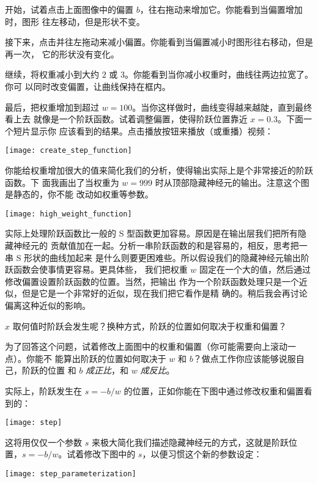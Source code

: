 开始，试着点击上面图像中的偏置 $b$，往右拖动来增加它。你能看到当偏置增加时，图形
往左移动，但是形状不变。

接下来，点击并往左拖动来减小偏置。你能看到当偏置减小时图形往右移动，但是再一次，
它的形状没有变化。

继续，将权重减小到大约 $2$ 或 $3$。你能看到当你减小权重时，曲线往两边拉宽了。你可
以同时改变偏置，让曲线保持在框内。

最后，把权重增加到超过 $w = 100$。当你这样做时，曲线变得越来越陡，直到最终看上去
就像是一个阶跃函数。试着调整偏置，使得阶跃位置靠近 $x = 0.3$。下面一个短片显示你
应该看到的结果。点击播放按钮来播放（或重播）视频：
\begin{center}
  \texttt{[image: create\_step\_function]}
\end{center}


你能给权重增加很大的值来简化我们的分析，使得输出实际上是个非常接近的阶跃函数。下
面我画出了当权重为 $w = 999$ 时从顶部隐藏神经元的输出。注意这个图是静态的，你不能
改动如权重等参数。
\begin{center}
  \texttt{[image: high\_weight\_function]}
\end{center}

实际上处理阶跃函数比一般的 S 型函数更加容易。原因是在输出层我们把所有隐藏神经元的
贡献值加在一起。分析一串阶跃函数的和是容易的，相反，思考把一串 S 形状的曲线加起来
是什么则要更困难些。所以假设我们的隐藏神经元输出阶跃函数会使事情更容易。更具体些，
我们把权重 $w$ 固定在一个大的值，然后通过修改偏置设置阶跃函数的位置。当然，把输出
作为一个阶跃函数处理只是一个近似，但是它是一个非常好的近似，现在我们把它看作是精
确的。稍后我会再讨论偏离这种近似的影响。

$x$ 取何值时阶跃会发生呢？换种方式，阶跃的位置如何取决于权重和偏置？

为了回答这个问题，试着修改上面图中的权重和偏置（你可能需要向上滚动一点）。你能不
能算出阶跃的位置如何取决于 $w$ 和 $b$？做点工作你应该能够说服自己，阶跃的位置
和 $b$ \emph{成正比}，和 $w$ \emph{成反比}。

实际上，阶跃发生在 $s = -b/w$ 的位置，正如你能在下图中通过修改权重和偏置看到的：
\begin{center}
  \texttt{[image: step]}
\end{center}

这将用仅仅一个参数 $s$ 来极大简化我们描述隐藏神经元的方式，这就是阶跃位置，$s =
-b/w$。试着修改下图中的 $s$，以便习惯这个新的参数设定：
\begin{center}
  \texttt{[image: step\_parameterization]}
\end{center}

